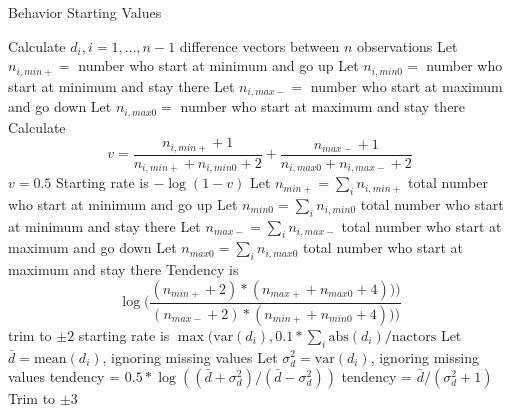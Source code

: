 \documentclass[12pt,a4paper]{article}
\makeatletter
\renewcommand{\=}{\,=\,}
\newcommand{\+}{\,+\,}
\renewcommand{\subsection}{\@startsection{subsection}{2}
                {0pt}{0.7\baselineskip}{0.3\baselineskip}
                {\sffamily} }
\makeatother
\begin{document}
\subsection{Behavior Starting Values}
\label{sec:behaviorstart}
\begin{algorithmic}
  \STATE Calculate $d_i, i=1,\ldots,n-1$
  difference vectors between $n$ observations
  \STATE Let $n_{i,min+} =$ number who start at minimum and go up
  \STATE Let $n_{i,min0} =$ number who start at minimum and stay there
  \STATE Let $n_{i,max-} =$ number who start at maximum and go down
  \STATE Let $n_{i,max0} =$ number who start at maximum and stay there
  \STATE Calculate $$ v = \frac{n_{i, min+} +1}{n_{i, min+} + n_{i,min0} + 2} +
  \frac{n_{max-} +1}{n_{i,max0} + n_{i,max-} + 2}$$
  \STATE$v=0.5$
  \ENDIF
  \ENDFOR
  \STATE Starting rate is $-\log(1-v)$
  \STATE Let $n_{min+} = \sum_i n_{i,min+}$ total number who start at minimum
  and go up
  \STATE Let $n_{min0} = \sum_i n_{i,min0}$ total number who start at minimum and
  stay there
  \STATE Let $n_{max-} = \sum_i n_{i,max-}$ total number who start at maximum
  and go down
  \STATE Let $n_{max0} = \sum_i n_{i,max0}$ total number who start at maximum
  and stay there
  \STATE Tendency is
  $$  \log(\frac{(n_{min+} + 2 ) * (n_{max+} + n_{max0} + 4)))}
  {(n_{max-} + 2 ) * (n_{min+} + n_{min0} + 4)))}
  $$
  \STATE trim to $\pm 2$
  \ENDIF
  \STATE starting rate is $\max(\mathrm{var}(d_i),
  0.1 * \sum_i \mathrm{abs}(d_i)/\mathrm{nactors} $
  \ENDFOR
  \STATE Let $\bar{d} = \mathrm{mean}(d_i)$, ignoring missing values
  \STATE Let $\sigma_d^2 = \mathrm{var} (d_i)$, ignoring missing values
  \STATE tendency = $0.5 * \log((\bar{d} + \sigma_d^2)/(\bar{d} - \sigma_d^2))$
  \ELSE
  \STATE tendency = $\bar{d} /(\sigma_d^2+ 1)$
  \ENDIF
  \STATE Trim to $\pm 3$
  \ENDIF
  \ENDIF
\end{algorithmic}
\end{document}
